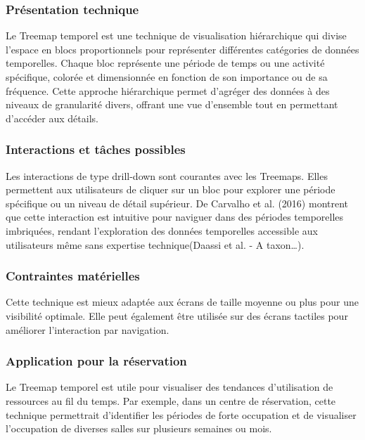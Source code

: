 \documentclass[runningheads]{llncs}
\begin{document}
\subsubsection{Présentation technique}
Le Treemap temporel est une technique de visualisation hiérarchique qui divise l'espace en blocs proportionnels pour représenter différentes catégories de données temporelles. Chaque bloc représente une période de temps ou une activité spécifique, colorée et dimensionnée en fonction de son importance ou de sa fréquence. Cette approche hiérarchique permet d’agréger des données à des niveaux de granularité divers, offrant une vue d’ensemble tout en permettant d’accéder aux détails.

\subsubsection{Interactions et tâches possibles}
Les interactions de type drill-down sont courantes avec les Treemaps. Elles permettent aux utilisateurs de cliquer sur un bloc pour explorer une période spécifique ou un niveau de détail supérieur. De Carvalho et al. (2016) montrent que cette interaction est intuitive pour naviguer dans des périodes temporelles imbriquées, rendant l’exploration des données temporelles accessible aux utilisateurs même sans expertise technique(Daassi et al. - A taxon…).

\subsubsection{Contraintes matérielles}
Cette technique est mieux adaptée aux écrans de taille moyenne ou plus pour une visibilité optimale. Elle peut également être utilisée sur des écrans tactiles pour améliorer l’interaction par navigation.

\subsubsection{Application pour la réservation}
Le Treemap temporel est utile pour visualiser des tendances d’utilisation de ressources au fil du temps. Par exemple, dans un centre de réservation, cette technique permettrait d’identifier les périodes de forte occupation et de visualiser l’occupation de diverses salles sur plusieurs semaines ou mois.
\end{document}
